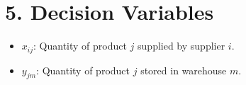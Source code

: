\documentclass{article}
\begin{document}
\section{5. Decision Variables}
\begin{itemize}
    \item $ x_{ij} $: Quantity of product $ j $ supplied by supplier $ i $.
    \item $ y_{jm} $: Quantity of product $ j $ stored in warehouse $ m $.
\end{itemize}
\end{document}
